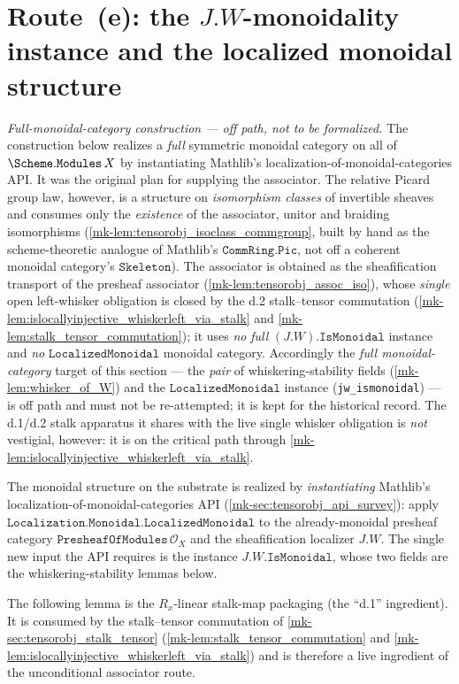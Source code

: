 \section{Route~(e): the \(J.W\)-monoidality instance and the localized monoidal structure}
\label{mk-sec:tensorobj_route_e}

\emph{Full-monoidal-category construction --- off path, not to be formalized.} The
construction below realizes a \emph{full} symmetric monoidal category on all of
\(\Scheme.\mathtt{Modules}\,X\) by instantiating Mathlib's
localization-of-monoidal-categories API. It was the original plan for supplying the
associator. The relative Picard group law, however, is a structure on
\emph{isomorphism classes} of invertible sheaves and consumes only the
\emph{existence} of the associator, unitor and braiding isomorphisms
(\ref{mk-lem:tensorobj_isoclass_commgroup}, built by hand as the scheme-theoretic
analogue of Mathlib's \(\mathtt{CommRing.Pic}\), not off a coherent monoidal
category's \(\mathtt{Skeleton}\)). The associator is obtained as the sheafification
transport of the presheaf associator (\ref{mk-lem:tensorobj_assoc_iso}), whose
\emph{single} open left-whisker obligation is closed by the d.2 stalk--tensor
commutation (\ref{mk-lem:islocallyinjective_whiskerleft_via_stalk} and
\ref{mk-lem:stalk_tensor_commutation}); it uses \emph{no} \emph{full}
\((J.W).\mathtt{IsMonoidal}\) instance and \emph{no} \(\mathtt{LocalizedMonoidal}\)
monoidal category. Accordingly the \emph{full monoidal-category} target of this
section --- the \emph{pair} of whiskering-stability fields (\ref{mk-lem:whisker_of_W})
and the \(\mathtt{LocalizedMonoidal}\) instance (\texttt{jw\_ismonoidal}) --- is off
path and must not be re-attempted; it is kept for the historical record. The d.1/d.2
stalk apparatus it shares with the live single whisker obligation is \emph{not}
vestigial, however: it is on the critical path through
\ref{mk-lem:islocallyinjective_whiskerleft_via_stalk}.

The monoidal structure on the substrate is realized by \emph{instantiating}
Mathlib's localization-of-monoidal-categories API
(\ref{mk-sec:tensorobj_api_survey}): apply
\(\mathtt{Localization.Monoidal.LocalizedMonoidal}\) to the already-monoidal
presheaf category \(\mathtt{PresheafOfModules}\,\mathcal{O}_X\) and the
sheafification localizer \(J.W\). The single new input the API requires is the
instance \(J.W.\mathtt{IsMonoidal}\), whose two fields are the
whiskering-stability lemmas below.


The following lemma is the \(R_x\)-linear stalk-map packaging (the ``d.1''
ingredient). It is consumed by the stalk--tensor commutation of
\ref{mk-sec:tensorobj_stalk_tensor} (\ref{mk-lem:stalk_tensor_commutation} and
\ref{mk-lem:islocallyinjective_whiskerleft_via_stalk}) and is therefore a live ingredient
of the unconditional associator route.

